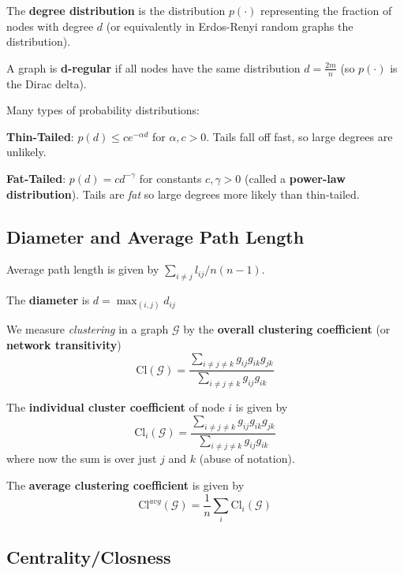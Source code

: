 \documentclass[9pt]{article}
\begin{document}
\begin{multicols}{2}
The \textbf{degree distribution} is the distribution $p(\cdot)$ 
representing the fraction of nodes with degree $d$ (or equivalently
in Erdos-Renyi random graphs the distribution).

A graph is \textbf{d-regular} if all nodes have the same distribution $d=\frac{2m}{n}$ (so $p(\cdot)$ is the Dirac delta).

Many types of probability distributions:

\textbf{Thin-Tailed}: $p(d) \le ce^{-\alpha d}$ for $\alpha, c > 0$. Tails fall off fast, so large degrees are unlikely.

\textbf{Fat-Tailed}: $p(d)=cd^{-\gamma}$ for constants $c,\gamma > 0$ (called a \textbf{power-law distribution}). Tails are \textit{fat} so large degrees more likely than thin-tailed.

\subsection{Diameter and Average Path Length}

Average path length is given by $\sum_{i \ne j} l_{ij}/n(n-1)$. 

The \textbf{diameter} is $d=\max_{(i,j)} d_{ij}$

We measure \textit{clustering} in a graph $\mathcal{G}$ by the \textbf{overall clustering coefficient} (or \textbf{network transitivity})
\begin{equation}
\text{Cl}(\mathcal{G})=\frac{\sum_{i \ne j \ne k} g_{ij}g_{ik}g_{jk}}{\sum_{i \ne j \ne k} g_{ij}g_{ik}}
\end{equation}

The \textbf{individual cluster coefficient} of node $i$ is given by
\begin{equation}
\text{Cl}_i(\mathcal{G})=\frac{\sum_{i \ne j \ne k} g_{ij}g_{ik}g_{jk}}{\sum_{i \ne j \ne k} g_{ij}g_{ik}}
\end{equation}
where now the sum is over just $j$ and $k$ (abuse of notation).

The \textbf{average clustering coefficient} is given by 
\begin{equation}
\text{Cl}^{avg}(\mathcal{G})=\frac{1}{n}\sum_{i}{\text{Cl}_i(\mathcal{G})}
\end{equation}

\subsection{Centrality/Closness}


\end{multicols}
\end{document}
